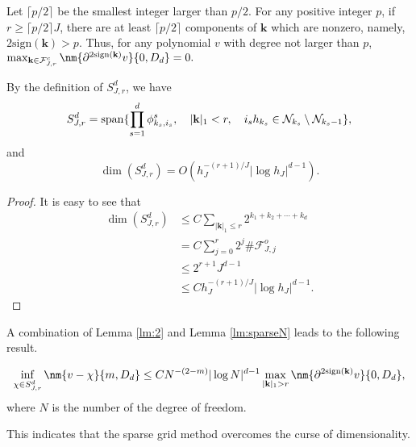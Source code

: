 \begin{remark}
Let $ \lceil p/2\rceil$ be the smallest integer larger than $p/2$. For any positive integer $p$, if $r\ge \lceil p/2\rceil J$, there are at least $\lceil p/2\rceil$ components of $\mathbf{k}$ which are nonzero, namely, $2\text{sign} (\mathbf{k})> p$. Thus, for any polynomial $v$ with degree not larger than $p$, $\max_{\mathbf k\in \mathcal{F}_{J,r}^c}\nm {\partial^{2\text{sign}(\mathbf k)}v}{0,D_d}=0.$
\end{remark}

\begin{lemma}\label{lm:sparseN}
By the definition of $S_{J,r}^d$, we have
$$
S_{J,r}^d={\rm span}\{\prod_{s=1}^d\phi_{k_s, i_s}^s,\quad
|\mathbf{k}|_1< r,\quad i_sh_{k_s}\in {\cal N}_{k_s}\setminus {\cal N}_{k_s-1}\},
$$
and
$$
\dim(S_{J,r}^d)=O(h_J^{-(r+1)/J}|\log h_J|^{d-1}).
$$
\end{lemma}
\begin{proof}
It is easy to see that
\begin{equation*}
\begin{split}
\dim(S_{J,r}^d) &\le C\sum_{|\mathbf k|_1\leq r}2^{k_1+k_2+\cdots+k_d}\\
&= C \sum_{j=0}^r 2^{j}\# \mathcal F_{J, j}^o\\
&\leq 2^{r+1}J^{d-1}\\
&\leq Ch_J^{-(r+1)/J}|\log h_J|^{d-1}.
\end{split}
\end{equation*}
\end{proof}

A combination of Lemma \ref{lm:2} and Lemma \ref{lm:sparseN} leads to the following result.
\begin{theorem}
$$
\inf_{\chi\in S_{J,r}^d}\nm{v-\chi}{m, D_d}\le C N^{-(2-m)}|\log N|^{d-1}\max_{|\mathbf k|_1> r}\nm {\partial^{2\text{sign}(\mathbf k)}v}{0,D_d},
$$
where $N$ is the number of the degree of freedom. 
\end{theorem}
This indicates that the sparse grid method overcomes the curse of dimensionality.



